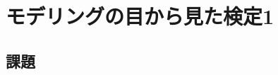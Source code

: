 \documentclass{ltjsbook}
\begin{document}
 
\chapter{モデリングの目から見た検定1}
\label{chapter20} 


\section{課題}
\end{document}
